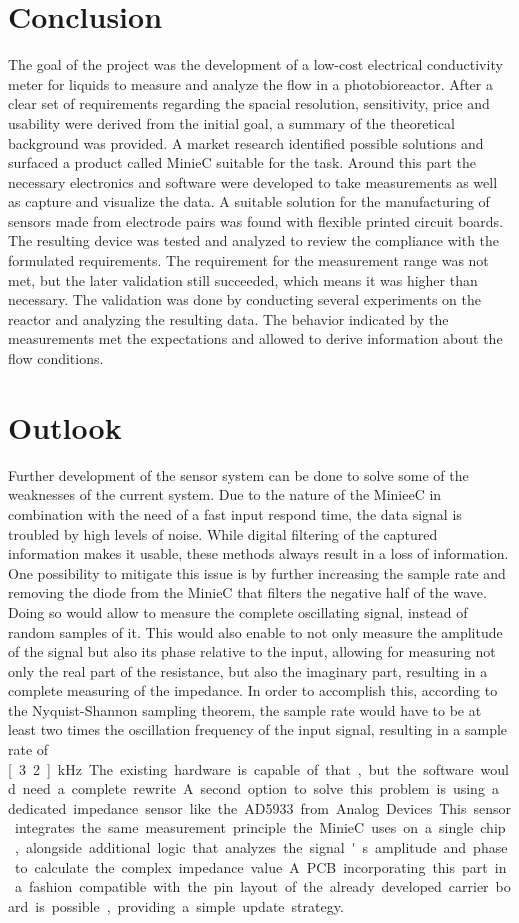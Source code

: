\chapter{Conclusion}

The goal of the project was the development of a low-cost electrical conductivity meter for liquids to measure and analyze the flow in a photobioreactor. After a clear set of requirements regarding the spacial resolution, sensitivity, price and usability were derived from the initial goal, a summary of the theoretical background was provided. A market research identified possible solutions and surfaced a product called MinieC suitable for the task. Around this part the necessary electronics and software were developed to take measurements as well as capture and visualize the data. A suitable solution for the manufacturing of sensors made from electrode pairs was found with flexible printed circuit boards. The resulting device was tested and analyzed to review the compliance with the formulated requirements. The requirement for the measurement range was not met, but the later validation still succeeded, which means it was higher than necessary. The validation was done by conducting several experiments on the reactor and analyzing the resulting data. The behavior indicated by the measurements met the expectations and allowed to derive information about the flow conditions.

\chapter{Outlook}

Further development of the sensor system can be done to solve some of the weaknesses of the current system. Due to the nature of the MinieeC in combination with the need of a fast input respond time, the data signal is troubled by high levels of noise. While digital filtering of the captured information makes it usable, these methods always result in a loss of information. One possibility to mitigate this issue is by further increasing the sample rate and removing the diode from the MinieC that filters the negative half of the wave. Doing so would allow to measure the complete oscillating signal, instead of random samples of it. This would also enable to not only measure the amplitude of the signal but also its phase relative to the input, allowing for measuring not only the real part of the resistance, but also the imaginary part, resulting in a complete measuring of the impedance. In order to accomplish this, according to the Nyquist-Shannon sampling theorem, the sample rate would have to be at least two times the oscillation frequency of the input signal, resulting in a sample rate of \unit[3.2]{kHz}. The existing hardware is capable of that, but the software would need a complete rewrite. A second option to solve this problem is using a dedicated impedance sensor like the AD5933 from Analog Devices. This sensor integrates the same measurement principle the MinieC uses on a single chip, alongside additional logic that analyzes the signal's amplitude and phase to calculate the complex impedance value. A PCB incorporating this part in a fashion compatible with the pin layout of the already developed carrier board is possible, providing a simple update strategy.